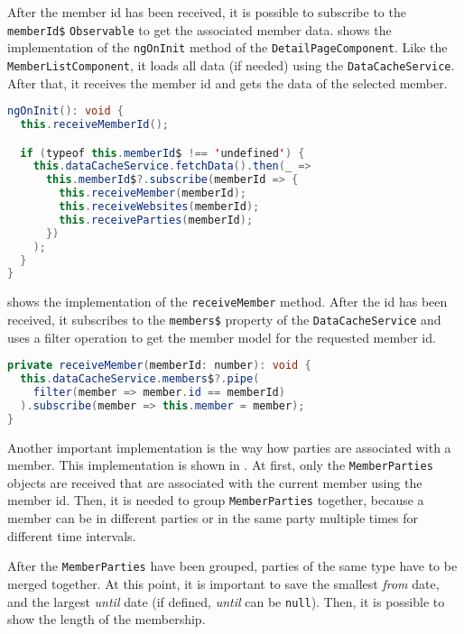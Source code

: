 After the member id has been received, it is possible to subscribe to the \texttt{memberId\$} \texttt{Observable} to get the associated member data.
 shows the implementation of the \texttt{ngOnInit} method of the \texttt{DetailPageComponent}. Like the \texttt{MemberListComponent}, it loads all data (if needed) using the \texttt{DataCacheService}. After that, it receives the member id and gets the data of the selected member.
\begin{lstlisting}[label=lst:02_impl_detail_ngoninit, caption=\texttt{ngOnInit} implementation of the \texttt{DetailPageComponent}, language=java]
ngOnInit(): void {
  this.receiveMemberId();

  if (typeof this.memberId$ !== 'undefined') {
    this.dataCacheService.fetchData().then(_ =>
      this.memberId$?.subscribe(memberId => {
        this.receiveMember(memberId);
        this.receiveWebsites(memberId);
        this.receiveParties(memberId);
      })
    );
  }
}
\end{lstlisting}


 shows the implementation of the \texttt{receiveMember} method. After the id has been received, it subscribes to the \texttt{members\$} property of the \texttt{DataCacheService} and uses a filter operation to get the member model for the requested member id.
\begin{lstlisting}[label=lst:02_impl_detail_receivemember, caption=Implementation of the \texttt{receiveMember} method, language=java]
private receiveMember(memberId: number): void {
  this.dataCacheService.members$?.pipe(
    filter(member => member.id == memberId)
  ).subscribe(member => this.member = member);
}
\end{lstlisting}


Another important implementation is the way how parties are associated with a member. This implementation is shown in .
At first, only the \texttt{MemberParties} objects are received that are associated with the current member using the member id.
Then, it is needed to group \texttt{MemberParties} together, because a member can be in different parties or in the same party multiple times for different time intervals.

After the \texttt{MemberParties} have been grouped, parties of the same type have to be merged together. At this point, it is important to save the smallest \textit{from} date, and the largest \textit{until} date (if defined, \textit{until} can be \texttt{null}). Then, it is possible to show the length of the membership.

